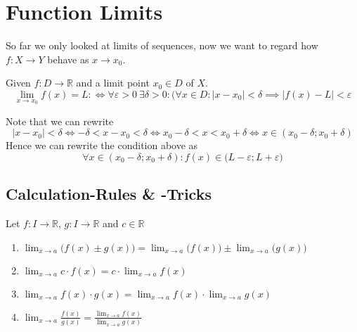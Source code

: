 \newpage

\section{Function Limits}
So far we only looked at limits of sequences, now we want to regard how \(f: X \to Y\) behave as \(x \to x_0\).

\begin{definition}\label{def:func_limit}
   Given \(f: D \to \mathbb{R}\) and a limit point \(x_0 \in D\) of \(X\).
   \[\lim_{x \to x_0} f(x) = L :\iff \forall \varepsilon > 0~\exists \delta > 0: (\forall x \in D: \lvert x - x_0 \rvert < \delta \implies \lvert f(x) - L\rvert < \varepsilon\]
\end{definition}
\begin{remark}[Intuition]
   Note that we can rewrite
   \[\lvert x - x_0\rvert < \delta \iff -\delta < x - x_0 < \delta \iff x_0 - \delta < x < x_0 + \delta \iff x \in (x_0 - \delta; x_0 + \delta)\]
   Hence we can rewrite the condition above as
   \[\forall x \in (x_0 - \delta; x_0 + \delta): f(x) \in \big(L - \varepsilon; L + \varepsilon\big)\]
\end{remark}

\begin{center}
   
\end{center}

\subsection{Calculation-Rules \& -Tricks}
\begin{proposition}
   Let \(f: I \to \mathbb{R}\), \(g: I \to \mathbb{R}\) and \(c \in \mathbb{R}\)
   \begin{enumerate}[label=\roman*, align=Center]
      \item \(\lim_{x \to a}\big(f(x) \pm g(x)\big) = \lim_{x \to a}\big(f(x)\big) \pm \lim_{x \to a}\big(g(x)\big)\)
      \item \(\lim_{x \to a} c \cdot f(x) = c \cdot \lim_{x \to a} f(x)\)
      \item \(\lim_{x \to a} f(x) \cdot g(x) = \lim_{x \to a} f(x) \cdot \lim_{x \to a} g(x)\)
      \item \(\lim_{x \to a} \frac{f(x)}{g(x)} = \frac{\lim_{x \to a} f(x)}{\lim_{x \to a} g(x)}\)
   \end{enumerate}
\end{proposition}

